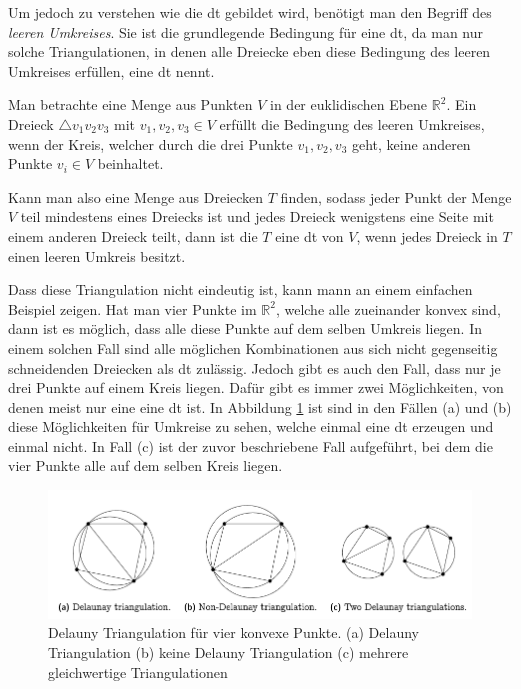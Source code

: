 Um jedoch zu verstehen wie die \ac{dt} gebildet wird, benötigt man den Begriff des \emph{leeren Umkreises}. Sie ist die grundlegende Bedingung für eine \ac{dt}, da man nur solche Triangulationen, in denen alle Dreiecke eben diese 
Bedingung des leeren Umkreises erfüllen, eine \ac{dt} nennt.\cite{delauny}

Man betrachte eine Menge aus Punkten $V$ in der euklidischen Ebene $\mathbb{R}^2$. Ein Dreieck $\triangle v_1v_2v_3$ mit $v_1, v_2, v_3 \in V$ erfüllt die Bedingung des leeren Umkreises, wenn der Kreis, welcher durch die drei Punkte $v_1, v_2, v_3$ geht, 
keine anderen Punkte $v_i \in V$ beinhaltet. 

Kann man also eine Menge aus Dreiecken $T$ finden, sodass jeder Punkt der Menge $V$ teil mindestens eines Dreiecks ist und jedes Dreieck wenigstens eine Seite mit einem anderen Dreieck teilt, dann
ist die $T$ eine \ac{dt} von $V$, wenn jedes Dreieck in $T$ einen leeren Umkreis besitzt. 

Dass diese Triangulation nicht eindeutig ist, kann mann an einem einfachen Beispiel zeigen. Hat man vier Punkte im $\mathbb{R}^2$, welche alle zueinander konvex sind, dann ist es möglich, dass alle diese Punkte auf dem selben Umkreis liegen.
In einem solchen Fall sind alle möglichen Kombinationen aus sich nicht gegenseitig schneidenden Dreiecken als \ac{dt} zulässig. Jedoch gibt es auch den Fall, dass nur je drei Punkte auf einem Kreis liegen. Dafür gibt es immer zwei Möglichkeiten, von denen 
meist nur eine eine \ac{dt} ist. In Abbildung \ref{fig:fourpointdt} ist sind in den Fällen (a) und (b) diese Möglichkeiten für Umkreise zu sehen, welche einmal eine \ac{dt} erzeugen und einmal nicht. In Fall (c) ist der zuvor beschriebene Fall aufgeführt, 
bei dem die vier Punkte alle auf dem selben Kreis liegen.

\begin{figure}[h]
    \centering
    \includegraphics[width=1\textwidth]{bilder/fourpointdt.png}
    \caption[Delauny Triangulation für vier konvexe Punkte]{Delauny Triangulation für vier konvexe Punkte. (a) Delauny Triangulation (b) keine Delauny Triangulation (c) mehrere gleichwertige Triangulationen \cite{delauny}}
    \label{fig:fourpointdt}
\end{figure}

